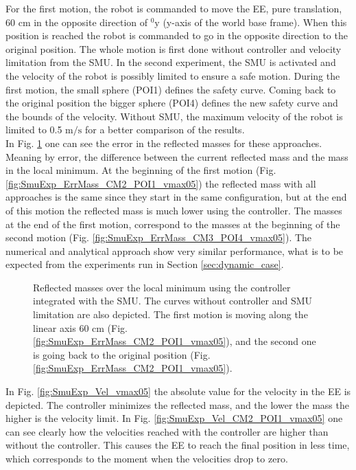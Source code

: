 For the first motion, the robot is commanded to move the EE, pure translation, 60 cm in the opposite direction of $\mathrm{{}^{0}_{}y}$  (y-axis of the world base frame). When this position is reached the robot is commanded to go in the opposite direction to the original position.
The whole motion is first done without controller and velocity limitation from the SMU. In the second experiment, the SMU is activated and the velocity of the robot is possibly limited to ensure a safe motion. During the first motion, the small sphere (POI1) defines the safety curve. Coming back to the original position the bigger sphere (POI4) defines the new safety curve and the bounds of the velocity. Without SMU, the maximum velocity of the robot is limited to 0.5 $\mathrm{m/s}$ for a better comparison of the results. \\
In  Fig. \ref{fig:SmuExp_ErrMass_vmax05} one can see the error in the reflected masses for these approaches. Meaning by error, the difference between the current reflected mass and the mass in the local minimum. At the beginning of the first motion (Fig. \ref{fig:SmuExp_ErrMass_CM2_POI1_vmax05}) the reflected mass with all approaches is the same since they start in the same configuration, but at the end of this motion the reflected mass is much lower using the controller. The masses at the end of the first motion, correspond to the masses at the beginning of the second motion (Fig. \ref{fig:SmuExp_ErrMass_CM3_POI4_vmax05}). The numerical and analytical approach show very similar performance, what is to be expected from the experiments run in Section \ref{sec:dynamic_case}.
%
%
%
\begin{figure}[htb!]
	\centering	
	 	 	
	\caption{Reflected masses over the local minimum using the controller integrated with the SMU. The curves without controller and  SMU limitation are also depicted. The first motion is moving along the linear axis 60 cm (Fig. \ref{fig:SmuExp_ErrMass_CM2_POI1_vmax05}), and the second one is going back to the original position (Fig. \ref{fig:SmuExp_ErrMass_CM2_POI1_vmax05}).}
	\label{fig:SmuExp_ErrMass_vmax05}
\end{figure}
%
%
In Fig. \ref{fig:SmuExp_Vel_vmax05} the absolute value for the velocity in the EE is depicted. The controller minimizes the reflected mass, and the lower the mass the higher is the velocity limit.  In Fig. \ref{fig:SmuExp_Vel_CM2_POI1_vmax05} one can see clearly how the velocities reached with the controller are higher than without the controller. This causes the EE to reach the final position in less time, which corresponds to the moment when the velocities drop to zero. 
